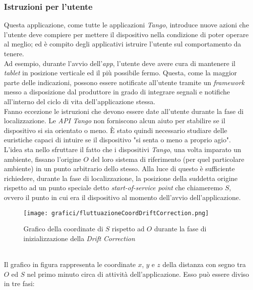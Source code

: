 \subsubsection{Istruzioni per l'utente}
Questa applicazione, come tutte le applicazioni \emph{Tango}, introduce nuove azioni che l'utente deve compiere per mettere il dispositivo nella condizione di poter operare al meglio; ed è compito degli applicativi istruire l'utente sul comportamento da tenere.\\
Ad esempio, durante l'avvio dell'\emph{app}, l'utente deve avere cura di mantenere il \emph{tablet} in posizione verticale ed il più possibile fermo. Questa, come la maggior parte delle indicazioni, possono essere notificate all'utente tramite un \emph{framework} messo a disposizione dal produttore in grado di integrare segnali e notifiche all'interno del ciclo di vita dell'applicazione stessa.\\
Fanno eccezione le istruzioni che devono essere date all'utente durante la fase di localizzazione. Le \emph{API Tango} non forniscono alcun aiuto per stabilire se il dispositivo si sia orientato o meno. È stato quindi necessario studiare delle euristiche capaci di intuire se il dispositivo "si senta o meno a proprio agio".\\
L'idea sta nello sfruttare il fatto che i dispositivi \emph{Tango}, una volta imparato un ambiente, fissano l'origine $O$ del loro sistema di riferimento (per quel particolare ambiente) in un punto arbitrario dello stesso. Alla luce di questo è sufficiente richiedere, durante la fase di localizzazione, la posizione della suddetta origine rispetto ad un punto speciale detto \emph{start-of-service point} che chiameremo $S$, ovvero il punto in cui era il dispositivo al momento dell'avvio dell'applicazione.\\
\begin{figure}[!h] 
    \centering 
    \texttt{[image: grafici/fluttuazioneCoordDriftCorrection.png]} 
    \caption{Grafico della coordinate di $S$ rispetto ad $O$ durante la fase di inizializzazione della \emph{Drift Correction}}
\end{figure}
\\
Il grafico in figura rappresenta le coordinate $x$, $y$ e $z$ della distanza con segno tra $O$ ed $S$ nel primo minuto circa di attività dell'applicazione. Esso può essere diviso in tre fasi:

